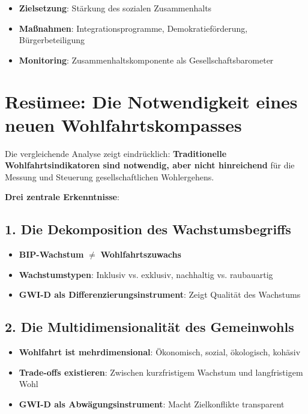 \begin{itemize}
    \item \textbf{Zielsetzung}: Stärkung des sozialen Zusammenhalts
    \item \textbf{Maßnahmen}: Integrationsprogramme, Demokratieförderung, Bürgerbeteiligung
    \item \textbf{Monitoring}: Zusammenhaltskomponente als Gesellschaftsbarometer
\end{itemize}

\section{Resümee: Die Notwendigkeit eines neuen Wohlfahrtskompasses}

Die vergleichende Analyse zeigt eindrücklich: \textbf{Traditionelle Wohlfahrtsindikatoren sind notwendig, aber nicht hinreichend} für die Messung und Steuerung gesellschaftlichen Wohlergehens.

\textbf{Drei zentrale Erkenntnisse}:

\subsection{1. Die Dekomposition des Wachstumsbegriffs}

\begin{itemize}
    \item \textbf{BIP-Wachstum} \(\neq\) \textbf{Wohlfahrtszuwachs}
    \item \textbf{Wachstumstypen}: Inklusiv vs. exklusiv, nachhaltig vs. raubauartig
    \item \textbf{GWI-D als Differenzierungsinstrument}: Zeigt Qualität des Wachstums
\end{itemize}

\subsection{2. Die Multidimensionalität des Gemeinwohls}

\begin{itemize}
    \item \textbf{Wohlfahrt ist mehrdimensional}: Ökonomisch, sozial, ökologisch, kohäsiv
    \item \textbf{Trade-offs existieren}: Zwischen kurzfristigem Wachstum und langfristigem Wohl
    \item \textbf{GWI-D als Abwägungsinstrument}: Macht Zielkonflikte transparent
\end{itemize}


